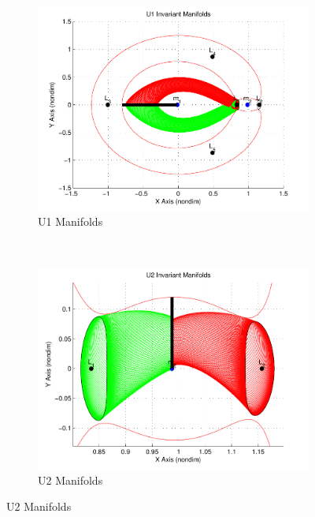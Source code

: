 \begin{figure}
     \centering
        \begin{subfigure}[b]{0.5\textwidth}
                \includegraphics[width=\columnwidth]{figures/2015_SSPI/U1_Manifolds}
                \caption{U1 Manifolds}
                \label{fig:u1_manifolds}
        \end{subfigure}%
        ~%
        \begin{subfigure}[b]{0.5\textwidth}
                \includegraphics[width=\columnwidth]{figures/2015_SSPI/U2_Manifolds}
                \caption{U2 Manifolds}
                \label{fig:u2_manifolds}
        \end{subfigure}
        

\end{figure}
